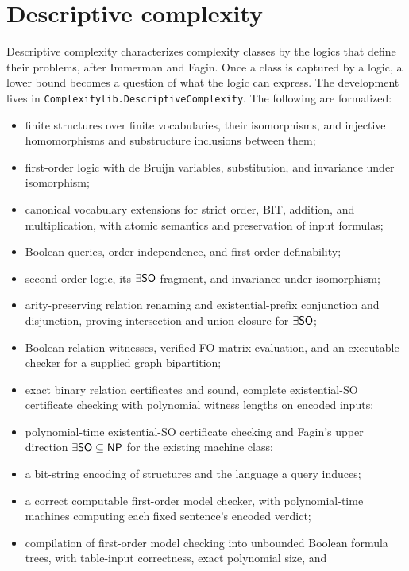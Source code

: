 \chapter{Descriptive complexity}
\label{chap:descriptive}

Descriptive complexity characterizes complexity classes by the logics that
define their problems, after Immerman and Fagin. Once a class is captured by a
logic, a lower bound becomes a question of what the logic can express. The
development lives in \texttt{Complexitylib.DescriptiveComplexity}. The following
are formalized:
\begin{itemize}
  \item finite structures over finite vocabularies, their isomorphisms, and
    injective homomorphisms and substructure inclusions between them;
  \item first-order logic with de Bruijn variables, substitution, and invariance
    under isomorphism;
  \item canonical vocabulary extensions for strict order, BIT, addition, and
    multiplication, with atomic semantics and preservation of input formulas;
  \item Boolean queries, order independence, and first-order definability;
  \item second-order logic, its $\exists\mathsf{SO}$ fragment, and invariance under
    isomorphism;
  \item arity-preserving relation renaming and existential-prefix conjunction
    and disjunction, proving intersection and union closure for $\exists\mathsf{SO}$;
  \item Boolean relation witnesses, verified FO-matrix evaluation, and an
    executable checker for a supplied graph bipartition;
  \item exact binary relation certificates and sound, complete existential-SO
    certificate checking with polynomial witness lengths on encoded inputs;
  \item polynomial-time existential-SO certificate checking and Fagin's upper
    direction $\exists\mathsf{SO}\subseteq\mathsf{NP}$ for the existing machine class;
  \item a bit-string encoding of structures and the language a query induces;
  \item a correct computable first-order model checker, with polynomial-time
    machines computing each fixed sentence's encoded verdict;
  \item compilation of first-order model checking into unbounded Boolean
    formula trees, with table-input correctness, exact polynomial size, and

\end{itemize}
